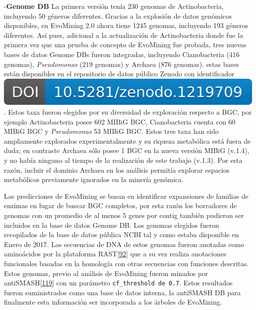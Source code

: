 \documentclass[12pt,twoside]{reedthesis}
\begin{document}
  -\textbf{Genome DB} La primera versión tenía 230 genomas de
  Actinobacteria, incluyendo 50 géneros diferentes. Gracias a la explosión
  de datos genómicos disponibles, en EvoMining 2.0 ahora tiene 1245
  genomas, incluyendo 193 géneros diferentes. Así pues, adicional a la
  actualización de Actinobacteria donde fue la primera vez que una prueba
  de concepto de EvoMining fue probada, tres nuevas bases de datos Genome
  DBs fueron integradas, incluyendo Cianobacteria (416 genomas),
  \emph{Pseudomonas} (219 genomas) y Archaea (876 genomas). estas bases
  están disponibles en el repositorio de datos público Zenodo con
  identificador
  \href{https://doi.org/10.5281/zenodo.1219709}{\includegraphics{chapter2/zenodo_1219709.png}}.
  Estos taxa fueron elegidos por su diversidad de exploración respecto a
  BGC, por ejemplo Actinobacteria posee 602 MIBiG BGC, Cianobacteria
  cuenta con 60 MIBiG BGC y \emph{Pseudomonas} 53 MIBiG BGC. Estos tres
  taxa han sido ampliamente explorados experimentalmente y su riqueza
  metabólica está fuera de duda; en contraste Archaea sólo posee 1 BGC en
  la nueva versión MIBiG (v.1.4), y no había ninguno al tiempo de la
  realización de este trabajo (v.1.3). Por esta razón, incluir el dominio
  Archaea en los análisis permitía explorar espacios metabólicos
  previamente ignorados en la minería genómica.
  
  Las predicciones de EvoMining se basan en identificar expansiones de
  familias de enzimas en lugar de buscar BGC completos, por esta razón los
  borradores de genomas con un promedio de al menos 5 genes por contig
  también pudieron ser incluidos en la base de datos Genome DB. Los
  genomas elegidos fueron recopilados de la base de datos pública NCBI tal
  y como estaba disponible en Enero de 2017. Las secuencias de DNA de
  estos genomas fueron anotadas como aminoácidos por la plataforma
  RAST{[}\protect\hyperlink{ref-overbeek_seed_2014}{92}{]} que a su vez
  realiza anotaciones funcionales basadas en la homología con otras
  secuencias con funciones descritas. Estos genomas, previo al análisis de
  EvoMining fueron minados por
  antiSMASH{[}\protect\hyperlink{ref-weber_antismash3_2015}{119}{]} con un
  parámetro \texttt{cf\_threshold\ de\ 0.7}. Estos resultados fueron
  suministrados como una base de datos interna, la antiSMASH DB para
  finalmente esta información ser incorporada a los árboles de EvoMining.
  
\end{document}

